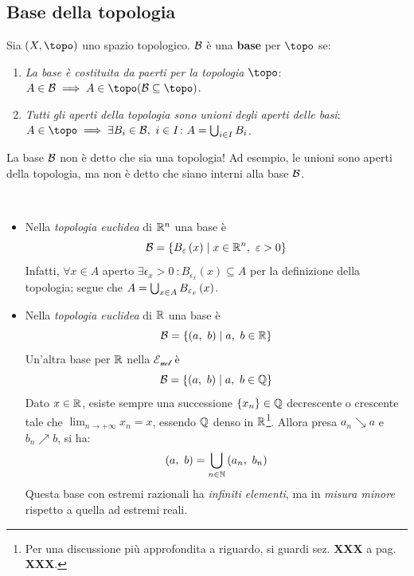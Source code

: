 \subsection{Base della topologia}
\begin{define}
	Sia $\left(X, \topo\right)$ uno spazio topologico. $\mathcal{B}$ è una \textbf{base} per $\topo$ se:
	\begin{enumerate}
		\item \textit{La base è costituita da paerti per la topologia $\topo$}: $A\in\basis\implies A\in\topo (\basis\subseteq\topo)$.
		\item \textit{Tutti gli aperti della topologia sono unioni degli aperti delle basi}:
		$A\in\topo\implies\exists B_i\in\basis,\ i\in I\colon A=\union_{i\in I}B_i$.
	\end{enumerate}
\end{define}
\begin{attention}
	La base $\mathcal{B}$ non è detto che sia una topologia! Ad esempio, le unioni sono aperti della topologia, ma non è detto che siano interni alla base $\mathcal{B}$.
\end{attention}
\begin{example}~{}
	\begin{itemize}
		\item Nella \textit{topologia euclidea} di $\mathbb{R}^n$ una base è
		\begin{equation}
			\mathcal{B}=\left\{B_{\varepsilon}\left(x\right)\mid x\in\mathbb{R}^n,\ \varepsilon>0\right\}
		\end{equation}
		Infatti, $\forall x\in A$ aperto $\exists\epsilon_x>0\ \colon B_{\epsilon_x}\left(x\right)\subseteq A$ per la definizione della topologia; segue che $A=\mathop{{\bigcup}}\displaylimits_{x\in A}B_{\varepsilon_x}\left(x\right)$.
		\item Nella \textit{topologia euclidea} di $\mathbb{R}$ una base è
		\begin{equation}
			\mathcal{B}=\left\{\left(a,\ b\right)\mid a,\ b\in \mathbb{R}\right\}
		\end{equation}
		Un'altra base per $\mathbb{R}$ nella $\mathcal{E_{ucl}}$ è 
		\begin{equation*}
			\basis=\left\{\left(a,\ b\right)\mid a,\ b\in \rationalset\right\}
		\end{equation*}
		Dato $x\in\mathbb{R}$, esiste sempre una successione $\left\{x_n\right\}\in\mathbb{Q}$ decrescente o crescente tale che $\displaystyle\lim_{n \to +\infty}x_n=x$, essendo $\mathbb{Q}$ denso in $\mathbb{R}$\footnote{Per una discussione più approfondita a riguardo, si guardi sez. \textbf{XXX} a pag. \textbf{XXX}.}. Allora presa $a_n\searrow a$ e $b_n\nearrow b$, si ha:
		\begin{equation*}
			\left(a,\ b\right)=\mathop{{\bigcup}}\displaylimits_{n\in \mathbb{N}}\left(a_n,\ b_n\right)
		\end{equation*}
		Questa base con estremi razionali ha \textit{infiniti elementi}, ma in \textit{misura minore} rispetto a quella ad estremi reali.
	\end{itemize}
\end{example}
